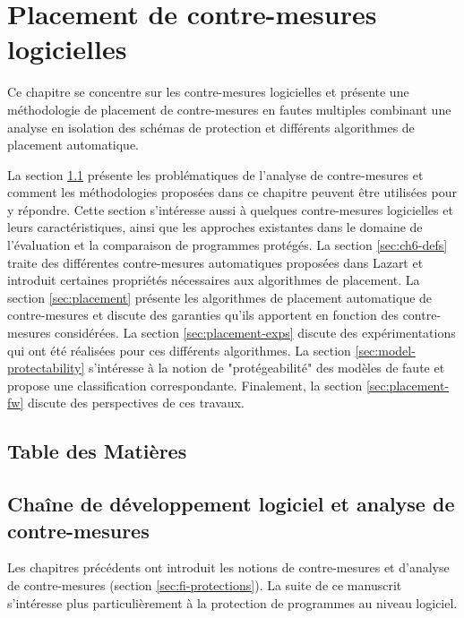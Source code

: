 \chapter{Placement de contre-mesures logicielles}
\label{chpt:placement}
    
    Ce chapitre se concentre sur les contre-mesures logicielles et présente une méthodologie de placement de contre-mesures en fautes multiples combinant une analyse en isolation des schémas de protection et différents algorithmes de placement automatique.      

    La section \ref{sec:soa-countermeasures} présente les problématiques de l'analyse de contre-mesures et comment les méthodologies proposées dans ce chapitre peuvent être utilisées pour y répondre. 
    Cette section s'intéresse aussi à quelques contre-mesures logicielles et leurs caractéristiques, ainsi que les approches existantes dans le domaine de l'évaluation et la comparaison de programmes protégés.
    La section \ref{sec:ch6-defs} traite des différentes contre-mesures automatiques proposées dans Lazart et introduit certaines propriétés nécessaires aux algorithmes de placement.
    La section \ref{sec:placement} présente les algorithmes de placement automatique de contre-mesures et discute des garanties qu'ils apportent en fonction des contre-mesures considérées.
    La section \ref{sec:placement-exps} discute des expérimentations qui ont été réalisées pour ces différents algorithmes.
    La section \ref{sec:model-protectability} s'intéresse à la notion de "protégeabilité" des modèles de faute et propose une classification correspondante.
    Finalement, la section \ref{sec:placement-fw} discute des perspectives de ces travaux. 
    
    \section*{Table des Matières}
    \localtableofcontents
    
    \section{Chaîne de développement logiciel et analyse de contre-mesures}
    \label{sec:soa-countermeasures}
    
        Les chapitres précédents ont introduit les notions de contre-mesures et d'analyse de contre-mesures (section \ref{sec:fi-protections}).
        La suite de ce manuscrit s'intéresse plus particulièrement à la protection de programmes au niveau logiciel.
        
